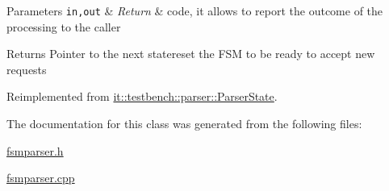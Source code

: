 \begin{DoxyParams}[1]{Parameters}
\mbox{\tt in,out}  & {\em Return} & code, it allows to report the outcome of the processing to the caller\\
\hline
\end{DoxyParams}
\begin{DoxyReturn}{Returns}
Pointer to the next statereset the F\-S\-M to be ready to accept new requests 
\end{DoxyReturn}


Reimplemented from \hyperlink{classit_1_1testbench_1_1parser_1_1ParserState_ac484747e6178b71b937eec45265fb4a7}{it\-::testbench\-::parser\-::\-Parser\-State}.



The documentation for this class was generated from the following files\-:\begin{DoxyCompactItemize}
\item 
\hyperlink{fsmparser_8h}{fsmparser.\-h}\item 
\hyperlink{fsmparser_8cpp}{fsmparser.\-cpp}\end{DoxyCompactItemize}
